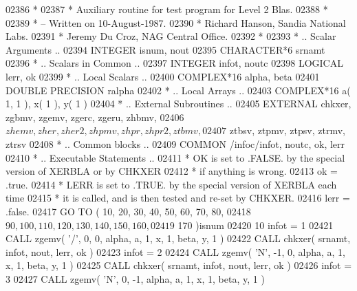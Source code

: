 \begin{DoxyCode}
02386 \textcolor{comment}{*}
02387 \textcolor{comment}{*  Auxiliary routine for test program for Level 2 Blas.}
02388 \textcolor{comment}{*}
02389 \textcolor{comment}{*  -- Written on 10-August-1987.}
02390 \textcolor{comment}{*     Richard Hanson, Sandia National Labs.}
02391 \textcolor{comment}{*     Jeremy Du Croz, NAG Central Office.}
02392 \textcolor{comment}{*}
02393 \textcolor{comment}{*     .. Scalar Arguments ..}
02394       \textcolor{keywordtype}{INTEGER}            isnum, nout
02395       \textcolor{keywordtype}{CHARACTER*6}        srnamt
02396 \textcolor{comment}{*     .. Scalars in Common ..}
02397       \textcolor{keywordtype}{INTEGER}            infot, noutc
02398       \textcolor{keywordtype}{LOGICAL}            lerr, ok
02399 \textcolor{comment}{*     .. Local Scalars ..}
02400       \textcolor{keywordtype}{COMPLEX*16}         alpha, beta
02401       \textcolor{keywordtype}{DOUBLE PRECISION}   ralpha
02402 \textcolor{comment}{*     .. Local Arrays ..}
02403       \textcolor{keywordtype}{COMPLEX*16}         a( 1, 1 ), x( 1 ), y( 1 )
02404 \textcolor{comment}{*     .. External Subroutines ..}
02405       \textcolor{keywordtype}{EXTERNAL}           chkxer, zgbmv, zgemv, zgerc, zgeru, zhbmv,
02406      $                   zhemv, zher, zher2, zhpmv, zhpr, zhpr2, ztbmv,
02407      $                   ztbsv, ztpmv, ztpsv, ztrmv, ztrsv
02408 \textcolor{comment}{*     .. Common blocks ..}
02409       \textcolor{keyword}{COMMON}             /infoc/infot, noutc, ok, lerr
02410 \textcolor{comment}{*     .. Executable Statements ..}
02411 \textcolor{comment}{*     OK is set to .FALSE. by the special version of XERBLA or by CHKXER}
02412 \textcolor{comment}{*     if anything is wrong.}
02413       ok = .true.
02414 \textcolor{comment}{*     LERR is set to .TRUE. by the special version of XERBLA each time}
02415 \textcolor{comment}{*     it is called, and is then tested and re-set by CHKXER.}
02416       lerr = .false.
02417       \textcolor{keywordflow}{GO TO} ( 10, 20, 30, 40, 50, 60, 70, 80,
02418      $        90, 100, 110, 120, 130, 140, 150, 160,
02419      $        170 )isnum
02420    10 infot = 1
02421       \textcolor{keyword}{CALL }zgemv( \textcolor{stringliteral}{'/'}, 0, 0, alpha, a, 1, x, 1, beta, y, 1 )
02422       \textcolor{keyword}{CALL }chkxer( srnamt, infot, nout, lerr, ok )
02423       infot = 2
02424       \textcolor{keyword}{CALL }zgemv( \textcolor{stringliteral}{'N'}, -1, 0, alpha, a, 1, x, 1, beta, y, 1 )
02425       \textcolor{keyword}{CALL }chkxer( srnamt, infot, nout, lerr, ok )
02426       infot = 3
02427       \textcolor{keyword}{CALL }zgemv( \textcolor{stringliteral}{'N'}, 0, -1, alpha, a, 1, x, 1, beta, y, 1 )

\end{DoxyCode}
